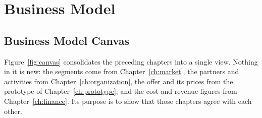 \chapter{Business Model}
\label{ch:business}

\section{Business Model Canvas}

Figure~\ref{fig:canvas} consolidates the preceding chapters into a single view.
Nothing in it is new: the segments come from Chapter~\ref{ch:market}, the
partners and activities from Chapter~\ref{ch:organization}, the offer and its
prices from the prototype of Chapter~\ref{ch:prototype}, and the cost and
revenue figures from Chapter~\ref{ch:finance}. Its purpose is to show that those
chapters agree with each other.

